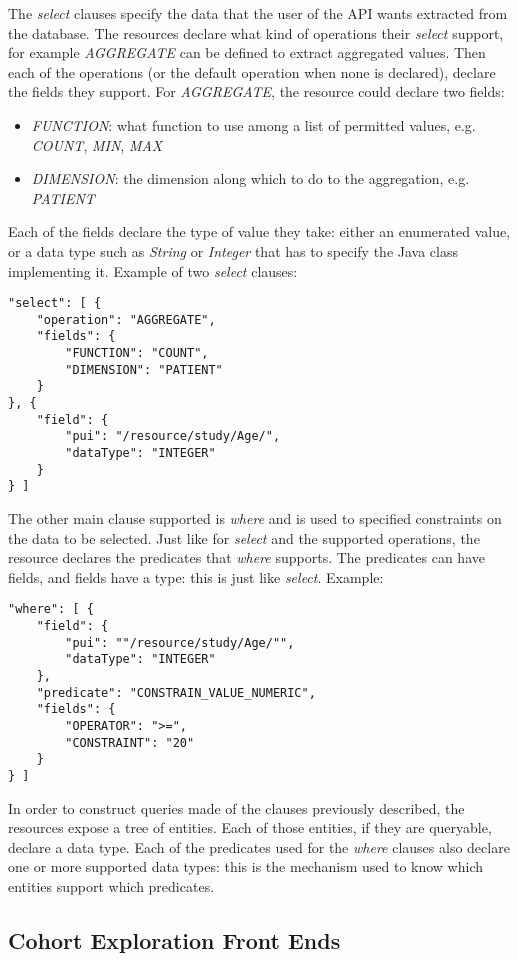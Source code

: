 The \emph{select} clauses specify the data that the user of the API wants extracted from the database.
The resources declare what kind of operations their \emph{select} support, for example \emph{AGGREGATE} can be defined to extract aggregated values.
Then each of the operations (or the default operation when none is declared), declare the fields they support.
For \emph{AGGREGATE}, the resource could declare two fields:
\begin{itemize}
    \item \emph{FUNCTION}: what function to use among a list of permitted values, e.g. \emph{COUNT}, \emph{MIN}, \emph{MAX}
    \item \emph{DIMENSION}: the dimension along which to do to the aggregation, e.g. \emph{PATIENT}
\end{itemize}
Each of the fields declare the type of value they take: either an enumerated value, or a data type such as \emph{String} or \emph{Integer} that has to specify the Java class implementing it.
Example of two \emph{select} clauses:
\begin{verbatim}
"select": [ {
    "operation": "AGGREGATE",
    "fields": {
        "FUNCTION": "COUNT",
        "DIMENSION": "PATIENT"
    }
}, {
    "field": {
        "pui": "/resource/study/Age/",
        "dataType": "INTEGER"
    }
} ]
\end{verbatim}

The other main clause supported is \emph{where} and is used to specified constraints on the data to be selected.
Just like for \emph{select} and the supported operations, the resource declares the predicates that \emph{where} supports.
The predicates can have fields, and fields have a type: this is just like \emph{select}. 
Example:
\begin{verbatim}
"where": [ {
    "field": {
        "pui": ""/resource/study/Age/"",
        "dataType": "INTEGER"
    },
    "predicate": "CONSTRAIN_VALUE_NUMERIC",
    "fields": {
        "OPERATOR": ">=",
        "CONSTRAINT": "20"
    }
} ]
\end{verbatim}

In order to construct queries made of the clauses previously described, the resources expose a tree of entities.
Each of those entities, if they are queryable, declare a data type.
Each of the predicates used for the \emph{where} clauses also declare one or more supported data types: this is the mechanism used to know which entities support which predicates.

\subsection{Cohort Exploration Front Ends}
